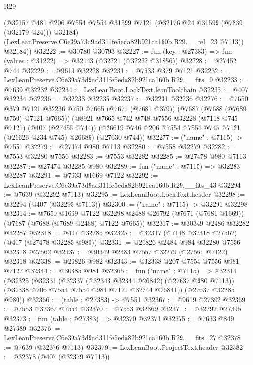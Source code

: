 \begin{lexlean}{R29}
\begin{coremodule}
          (@32157
            @481
            @206
            @7554
            @7554
            @31599
            @7121
            (@32176 @24 @31599 (@7839 (@32179 @24)))
            @32184)
          (LexLeanPreserve.C6e39a73d9ad311fe5eda82b921ca160b.R29.__rel_23 @7113))
        @32184))
@32222 := @30780 @30793
@32227 := fun (key : @27383) => fun (values : @31222) => @32143 (@32221 (@32222 @31856))
@32228 := @27452 @744
@32229 := @9619 @32228
@32231 := @7633 @379 @7121
@32232 := LexLeanPreserve.C6e39a73d9ad311fe5eda82b921ca160b.R29.__fits_9
@32233 := @7639 @32232
@32234 := LexLeanBoot.LockText.leanToolchain
@32235 := @407 @32234
@32236 := @32233 @32235
@32237 := @32231 @32236
@32276 := @7650
    @379
    @7121
    @32236
    @750
    @7665
    (@7671 (@7681 @379))
    (@7687 (@7688 (@7689 @750) @7121 @7665))
    (@8921
      @7665
      @742
      @748
      @7556
      @32228
      (@7118 @745 @7121)
      (@407 (@27455 @744))
      (@26619 @746 @206 @7554 @7554 @745 @7121 (@26626 @234 @745) @26686)
      (@27630 @744))
@32277 := ("name" : @7115) -> @7551
@32279 := @27474 @980 @7113
@32280 := @7558 @32279
@32282 := @7553 @32280 @7556
@32283 := @7553 @32282
@32285 := @27478 @980 @7113
@32287 := @27474 @32285 @980
@32289 := fun ("name" : @7115) => @32283 @32287
@32291 := @7633 @1669 @7122
@32292 := LexLeanPreserve.C6e39a73d9ad311fe5eda82b921ca160b.R29.__fits_43
@32294 := @7639 (@32292 @7113)
@32295 := LexLeanBoot.LockText.header
@32298 := @32294 (@407 (@32295 @7113))
@32300 := ("name" : @7115) -> @32291 @32298
@32314 := @7650
    @1669
    @7122
    @32298
    @2488
    @26792
    (@7671 (@7681 @1669))
    (@7687 (@7688 (@7689 @2488) @7122 @7665))
@32317 := @30349 @2486 @32282 @32287
@32318 := @407 @32285
@32325 := @32317 (@7118 @32318 @27562) (@407 (@27478 @32285 @980))
@32331 := @26826 @2484 @984 @32280 @7556 @32318 @27562
@32337 := @30349 @2483 @7557 @32279 (@27561 @7122) @32318
@32338 := @26826 @982
@32343 := @32338 @207 @7554 @7556 @981 @7122
@32344 := @30385 @981
@32365 := fun ("name" : @7115) =>
  @32314
    (@32325
      (@32331
        (@32337 (@32343 @32344 @26842) (@27637 @980 @7113))
        (@32338 @206 @7554 @7554 @981 @7121 @32344 @26841))
      (@27637 @32285 @980))
@32366 := (table : @27383) -> @7551
@32367 := @9619 @27392
@32369 := @7553 @32367 @7554
@32370 := @7553 @32369
@32371 := @32292 @27395
@32373 := fun (table : @27383) => @32370 @32371
@32375 := @7633 @849 @27389
@32376 := LexLeanPreserve.C6e39a73d9ad311fe5eda82b921ca160b.R29.__fits_27
@32378 := @7639 (@32376 @7113)
@32379 := LexLeanBoot.ProjectText.header
@32382 := @32378 (@407 (@32379 @7113))

\end{coremodule}
\end{lexlean}
